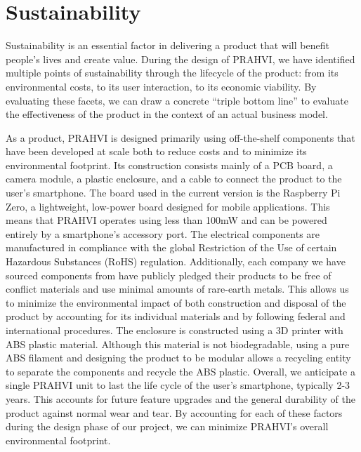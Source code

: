 \chapter{Sustainability}
	Sustainability is an essential factor in delivering a product that will benefit people's lives and create value. During the design of PRAHVI, we have identified multiple points of sustainability through the lifecycle of the product: from its environmental costs, to its user interaction, to its economic viability. By evaluating these facets, we can draw a concrete “triple bottom line” to evaluate the effectiveness of the product in the context of an actual business model.
	
	As a product, PRAHVI is designed primarily using off-the-shelf components that have been developed at scale both to reduce costs and to minimize its environmental footprint. Its construction consists mainly of a PCB board, a camera module, a plastic enclosure, and a cable to connect the product to the user's smartphone. The board used in the current version is the Raspberry Pi Zero, a lightweight, low-power board designed for mobile applications. This means that PRAHVI operates using less than 100mW and can be powered entirely by a smartphone's accessory port. The electrical components are manufactured in compliance with the global Restriction of the Use of certain Hazardous Substances (RoHS) regulation. Additionally, each company we have sourced components from have publicly pledged their products to be free of conflict materials and use minimal amounts of rare-earth metals. This allows us to minimize the environmental impact of both construction and disposal of the product by accounting for its individual materials and by following federal and international procedures. The enclosure is constructed using a 3D printer with ABS plastic material. Although this material is not biodegradable, using a pure ABS filament and designing the product to be modular allows a recycling entity to separate the components and recycle the ABS plastic. Overall, we anticipate a single PRAHVI unit to last the life cycle of the user's smartphone, typically 2-3 years. This accounts for future feature upgrades and the general durability of the product against normal wear and tear. By accounting for each of these factors during the design phase of our project, we can minimize PRAHVI's overall environmental footprint.
	
